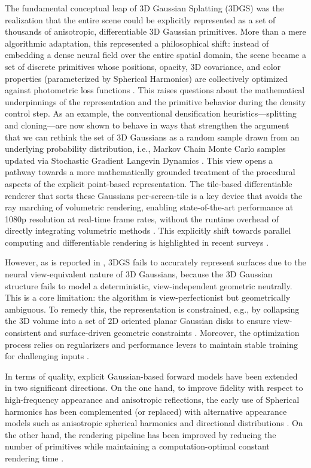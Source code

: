 \documentclass[11pt,a4paper]{article}
\begin{document}
The fundamental conceptual leap of 3D Gaussian Splatting (3DGS) was the realization that the entire scene could be explicitly represented as a set of thousands of anisotropic, differentiable 3D Gaussian primitives. More than a mere algorithmic adaptation, this represented a philosophical shift: instead of embedding a dense neural field over the entire spatial domain, the scene became a set of discrete primitives whose positions, opacity, 3D covariance, and color properties (parameterized by Spherical Harmonics) are collectively optimized against photometric loss functions \cite{arxiv:2308.04079v1}. This raises questions about the mathematical underpinnings of the representation and the primitive behavior during the density control step. As an example, the conventional densification heuristics---splitting and cloning---are now shown to behave in ways that strengthen the argument that we can rethink the set of 3D Gaussians as a random sample drawn from an underlying probability distribution, i.e., Markov Chain Monte Carlo samples updated via Stochastic Gradient Langevin Dynamics \cite{arxiv:2404.09591v3}. This view opens a pathway towards a more mathematically grounded treatment of the procedural aspects of the explicit point-based representation. The tile-based differentiable renderer that sorts these Gaussians per-screen-tile is a key device that avoids the ray marching of volumetric rendering, enabling state-of-the-art performance at 1080p resolution at real-time frame rates, without the runtime overhead of directly integrating volumetric methods \cite{arxiv:2308.04079v1}. This explicitly shift towards parallel computing and differentiable rendering is highlighted in recent surveys \cite{arxiv:2401.03890v2}.

However, as is reported in \cite{arxiv:2403.17888v1}, 3DGS fails to accurately represent surfaces due to the neural view-equivalent nature of 3D Gaussians, because the 3D Gaussian structure fails to model a deterministic, view-independent geometric neutrally. This is a core limitation: the algorithm is view-perfectionist but geometrically ambiguous. To remedy this, the representation is constrained, e.g., by collapsing the 3D volume into a set of 2D oriented planar Gaussian disks to ensure view-consistent and surface-driven geometric constraints \cite{arxiv:2403.17888v1,arxiv:2311.12775v3}. Moreover, the optimization process relies on regularizers and performance levers to maintain stable training for challenging inputs \cite{arxiv:2403.13806v1,arxiv:2404.10772v1}.

In terms of quality, explicit Gaussian-based forward models have been extended in two significant directions. On the one hand, to improve fidelity with respect to high-frequency appearance and anisotropic reflections, the early use of Spherical harmonics has been complemented (or replaced) with alternative appearance models such as anisotropic spherical harmonics \cite{arxiv:2402.15870v1} and directional distributions \cite{arxiv:2512.14180v2}. On the other hand, the rendering pipeline has been improved by reducing the number of primitives while maintaining a computation-optimal constant rendering time \cite{arxiv:2412.00578v3}.
\end{document}
